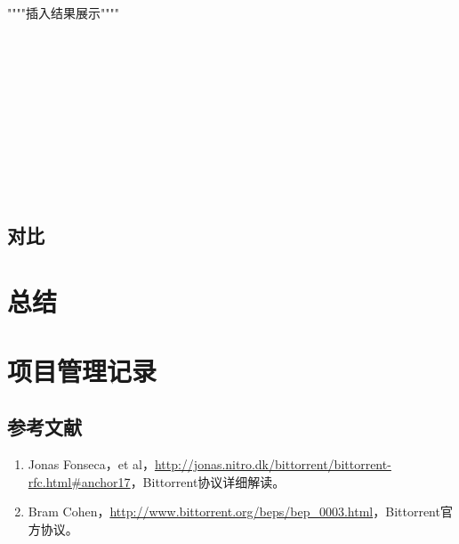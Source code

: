 \documentclass[15pt]{ctexart}
\begin{document}
\par """"插入结果展示""""
\\
\\
\\
\\
\\
\\
\\
\\
\\
\\
\\
\subsection{对比} %
\label{sub:对比}


\section{总结} %
\label{sec:总结}


\section{项目管理记录} %
\label{sec:项目管理记录}


\newpage
\appendixpage
\begin{appendices}
	\section{参考文献} %
	\begin{enumerate}
		\item Jonas Fonseca，et al，\url{http://jonas.nitro.dk/bittorrent/bittorrent-rfc.html#anchor17}，Bittorrent协议详细解读。
		\item Bram Cohen，\url{http://www.bittorrent.org/beps/bep_0003.html}，Bittorrent官方协议。
	\end{enumerate}
\end{appendices}
\end{document}
